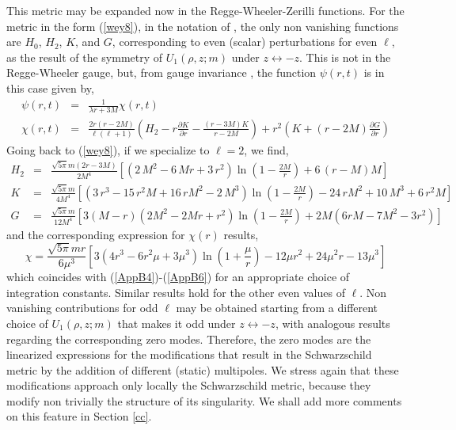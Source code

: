 \documentclass[12pt,aps,floats,showpacs,amssymb,tightenlines]{revtex4}
\begin{document}
This metric may be expanded now in the Regge-Wheeler-Zerilli
functions. For the metric in the form (\ref{wey8}), in the notation
of \cite{RW}, the only non vanishing functions are $H_0$, $H_2$,
$K$, and $G$, corresponding to even (scalar) perturbations for even
$\ell$, as the result of the  symmetry of $U_1(\rho,z;m)$ under $ z
\leftrightarrow -z$. This is not in the Regge-Wheeler gauge, but,
from gauge invariance \cite{moncrief}, the function $\psi(r,t)$ is
in this case given by,
\begin{eqnarray}
\label{wey9}
\psi(r,t) & = & \frac{1}{\lambda r+3M} \chi(r,t) \nonumber \\
\chi(r,t) & = & \frac{2r \left(r -2M\right)}{\ell (\ell+1) }  \left(
H_2   -r{ \frac {\partial K}{\partial r}}   -{\frac { \left( r- 3M
\right) K  }{r-2M}} \right)  + {r}^{2}  \left( K   +
 \left(r -2M \right) {\frac {\partial G}{\partial r}}    \right)
\end{eqnarray}
Going back to (\ref{wey8}), if we specialize to $\ell=2$, we find,
\begin{eqnarray}
\label{wey10} H_2 & = & {\frac {\sqrt { 5 \pi } m \left(
2r-3M\right)  }{2{M}^{4}}} \left[  \left( 2\,{M}^{2}-6
\,Mr+3\,{r}^{2} \right)  \ln  \left(1 -\frac{2M }{r}\right) +6\,
\left( r-M \right) M \right]
  \nonumber \\
K & = &  {\frac {\sqrt {5 \pi } m }{4{M}^{4}}}\left[ \left( 3\,{r}^{
3}-15\,{r}^{2}M+16\,r{M}^{2}-2\,{M}^{3} \right)   \ln  \left(1 -
\frac{2M}{r} \right) -24\,r{M}^{2}+10\,{M}^{ 3}+6\,{r}^{2}M \right]
\nonumber \\
G & = & {\frac {\sqrt {5 \pi }m}{12{M}^{4}}} \left[ 3 \left(M- r
 \right)  \left( 2{M}^{2}-2Mr+{r}^{2} \right)  \ln
 \left(1 -\frac{2M}{r} \right)
+2 M \left(6 r M -7 M^2 -3 r^2 \right)
  \right]
\end{eqnarray}
and the corresponding expression for $\chi(r)$ results,
\begin{equation}
\label{wey11} \chi= {\frac {  \sqrt {5 \pi } m r
}{6{\mu}^{3}}}\left[ 3 \left( 4{r}^{3}-6{r}^{2}\mu+3{\mu}^{3}
 \right)   \ln  \left( 1+\frac{\mu}{r}
 \right)  -12\mu {r}^{2}+24\mu^2 r-13{\mu}^{3}
 \right]
\end{equation}
which coincides with (\ref{AppB4})-(\ref{AppB6}) for  an appropriate
choice of integration constants. Similar results hold for the other
even values of $\ell$. Non vanishing contributions for odd $\ell$
may be
 obtained starting from a different choice of $U_1(\rho,z;m)$ that
 makes it odd under $z \longleftrightarrow -z$, with analogous results
 regarding the corresponding zero modes. Therefore, the zero modes are the linearized
expressions for the modifications that result in the Schwarzschild
metric by the addition of different (static) multipoles. We stress
again that these modifications approach only locally the
Schwarzschild metric, because they modify non trivially the
structure of its singularity. We shall add more comments on this
feature in Section \ref{cc}.
\end{document}
